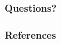 \documentclass[xcolor=dvipsnames,notes]{beamer}
\begin{document}


% 

% 


% 







% 

\begin{frame}
\frametitle{Questions?}
\end{frame}

\begin{frame}[allowframebreaks]
    \frametitle{References}
    
    
\end{frame}
\end{document}
